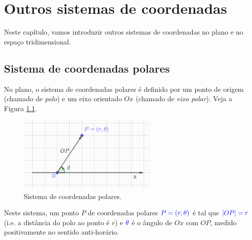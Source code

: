
\chapter{Outros sistemas de coordenadas}\label{cap_osc}
\thispagestyle{fancy}

Neste capítulo, vamos introduzir outros sistemas de coordenadas no plano e no espaço tridimensional.

\section{Sistema de coordenadas polares}\label{cap_osc_scp}

No plano, o sistema de coordenadas polares é definido por um ponto de origem (chamado de \emph{polo}) e um eixo orientado $Ox$ (chamado de \emph{eixo polar}). Veja a Figura \ref{fig:osc_scp}.

\begin{figure}[H]
  \centering
  \includegraphics[width=0.6\textwidth]{cap_osc/dados/fig_osc_scp/fig}
  \caption{Sistema de coordenadas polares.}
  \label{fig:osc_scp}
\end{figure}

Neste sistema, um ponto $P$ de coordenadas polares ${\color{blue}P=(r, \theta)}$ é tal que ${\color{blue}|OP| = r}$ (i.e. a distância do polo ao ponto é $r$) e ${\color{blue}\theta}$ é o ângulo de $Ox$ com $OP$, medido positivamente no sentido anti-horário.

